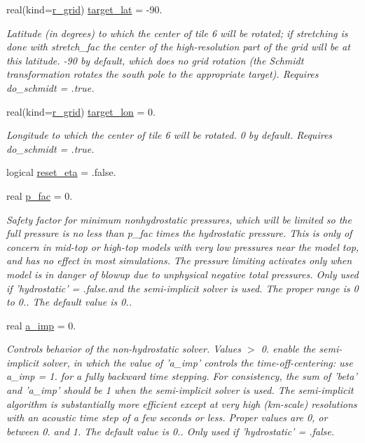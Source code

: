 \begin{DoxyCompactItemize}
real(kind=\hyperlink{classfv__arrays__mod_ab0ba8527d270f349a84fa0a330be1923}{r\-\_\-grid}) \hyperlink{structfv__arrays__mod_1_1fv__flags__type_aae83d2547ecc1f3f201f5ca43ce1ee01}{target\-\_\-lat} = -\/90.
\begin{DoxyCompactList}\small\item\em Latitude (in degrees) to which the center of tile 6 will be rotated; if stretching is done with stretch\-\_\-fac the center of the high-\/resolution part of the grid will be at this latitude. -\/90 by default, which does no grid rotation (the Schmidt transformation rotates the south pole to the appropriate target). Requires do\-\_\-schmidt = .true. \end{DoxyCompactList}\item 
real(kind=\hyperlink{classfv__arrays__mod_ab0ba8527d270f349a84fa0a330be1923}{r\-\_\-grid}) \hyperlink{structfv__arrays__mod_1_1fv__flags__type_a75dab9007778e7059a391cfd1a11a6e3}{target\-\_\-lon} = 0.
\begin{DoxyCompactList}\small\item\em Longitude to which the center of tile 6 will be rotated. 0 by default. Requires do\-\_\-schmidt = .true. \end{DoxyCompactList}\item 
logical \hyperlink{structfv__arrays__mod_1_1fv__flags__type_ac04a40d72a3f3e54af07ec092498c80a}{reset\-\_\-eta} = .false.
\item 
real \hyperlink{structfv__arrays__mod_1_1fv__flags__type_ac29dc9f75f651c3777e252afcbbe5529}{p\-\_\-fac} = 0.
\begin{DoxyCompactList}\small\item\em Safety factor for minimum nonhydrostatic pressures, which will be limited so the full pressure is no less than p\-\_\-fac times the hydrostatic pressure. This is only of concern in mid-\/top or high-\/top models with very low pressures near the model top, and has no effect in most simulations. The pressure limiting activates only when model is in danger of blowup due to unphysical negative total pressures. Only used if 'hydrostatic' = .false.\-and the semi-\/implicit solver is used. The proper range is 0 to 0.. The default value is 0.. \end{DoxyCompactList}\item 
real \hyperlink{structfv__arrays__mod_1_1fv__flags__type_a39331eb4717e02a2426b7aeefdcb46c6}{a\-\_\-imp} = 0.
\begin{DoxyCompactList}\small\item\em Controls behavior of the non-\/hydrostatic solver. Values $>$ 0. enable the semi-\/implicit solver, in which the value of 'a\-\_\-imp' controls the time-\/off-\/centering\-: use a\-\_\-imp = 1. for a fully backward time stepping. For consistency, the sum of 'beta' and 'a\-\_\-imp' should be 1 when the semi-\/implicit solver is used. The semi-\/implicit algorithm is substantially more efficient except at very high (km-\/scale) resolutions with an acoustic time step of a few seconds or less. Proper values are 0, or between 0. and 1. The default value is 0.. Only used if 'hydrostatic' = .false. \end{DoxyCompactList}\item 

\end{DoxyCompactItemize}
